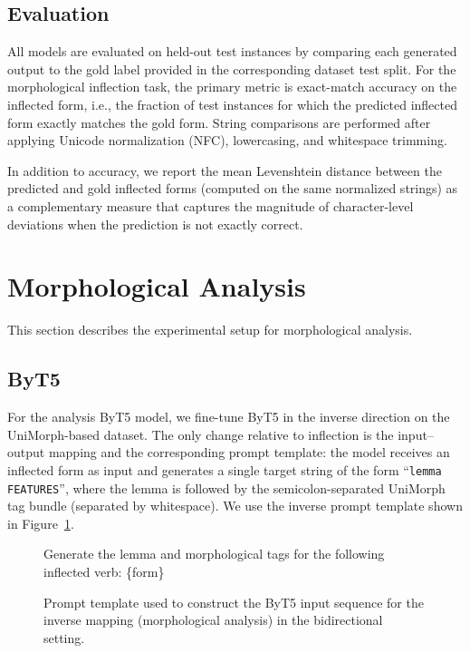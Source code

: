 \subsection{Evaluation}

All models are evaluated on held-out test instances by comparing each generated output to the gold label provided in the corresponding dataset test split. For the morphological inflection task, the primary metric is exact-match accuracy on the inflected form, i.e., the fraction of test instances for which the predicted inflected form exactly matches the gold form. String comparisons are performed after applying Unicode normalization (NFC), lowercasing, and whitespace trimming.

In addition to accuracy, we report the mean Levenshtein distance between the predicted and gold inflected forms (computed on the same normalized strings) as a complementary measure that captures the magnitude of character-level deviations when the prediction is not exactly correct.

\section{Morphological Analysis}

This section describes the experimental setup for morphological analysis.

\subsection{ByT5}

For the analysis ByT5 model, we fine-tune ByT5 in the inverse direction on the UniMorph-based dataset. The only change relative to inflection is the input--output mapping and the corresponding prompt template: the model receives an inflected form as input and generates a single target string of the form ``\texttt{lemma FEATURES}'', where the lemma is followed by the semicolon-separated UniMorph tag bundle (separated by whitespace). We use the inverse prompt template shown in Figure~\ref{fig:byt5_inverse_prompt}.

\begin{figure}[h]
\centering
\begin{minipage}{0.9\linewidth}
\small\ttfamily
Generate the lemma and morphological tags for the following inflected verb: \{form\}
\end{minipage}
\caption{Prompt template used to construct the ByT5 input sequence for the inverse mapping (morphological analysis) in the bidirectional setting.}
\label{fig:byt5_inverse_prompt}
\end{figure}


